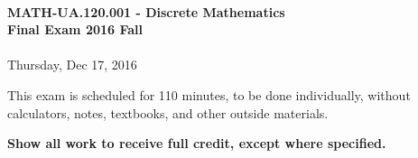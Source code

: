 \documentclass[12pt]{article}
\begin{document}
\thispagestyle{firststyle}
~
\vspace{0.5cm}

\begin{center}
\textbf{\Large MATH-UA.120.001 - Discrete Mathematics \\ \vspace{0.5cm} Final Exam 2016 Fall}\\~\\
Thursday, Dec 17, 2016
\end{center}

\vspace{1cm}


\vspace{1cm}

\noindent
This exam is scheduled for 110 minutes, to be done individually, without calculators, notes, textbooks, and other outside materials.
\vspace{0.5cm}

\noindent
\textbf{Show all work to receive full credit, except where specified.}

\vspace{1cm}
\end{document}

